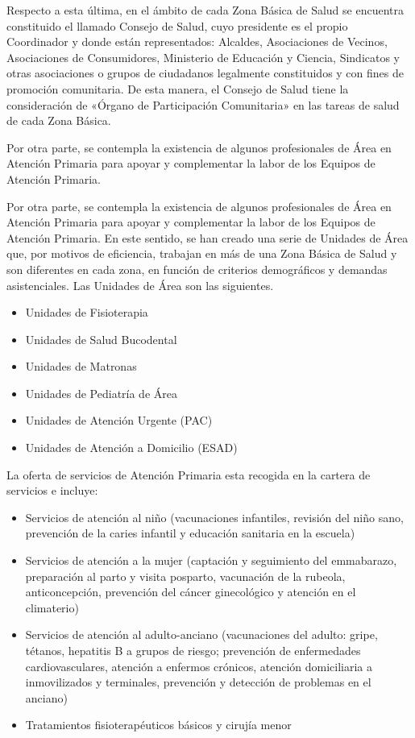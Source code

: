 Respecto a esta última, en el ámbito de cada Zona Básica de Salud se encuentra constituido el llamado Consejo de Salud, cuyo presidente es el propio Coordinador y donde están representados: Alcaldes, Asociaciones de Vecinos, Asociaciones de Consumidores, Ministerio de Educación y Ciencia, Sindicatos y otras asociaciones o grupos de ciudadanos legalmente constituidos y con fines de promoción comunitaria. De esta manera, el Consejo de Salud tiene la consideración de «Órgano de Participación Comunitaria» en las tareas de salud de cada Zona Básica.

Por otra parte, se contempla la existencia de algunos profesionales de Área en Atención Primaria para apoyar y complementar la labor de los Equipos de Atención Primaria.

Por otra parte, se contempla la existencia de algunos profesionales de Área en Atención Primaria para apoyar y complementar la labor de los Equipos de Atención Primaria. En este sentido, se han creado una serie de Unidades de Área que, por motivos de eficiencia, trabajan en más de una Zona Básica de Salud y son diferentes en cada zona, en función de criterios demográficos y demandas asistenciales. Las Unidades de Área son las siguientes.

\begin{itemize}
    \item Unidades de Fisioterapia
    \item Unidades de Salud Bucodental
    \item Unidades de Matronas
    \item Unidades de Pediatría de Área
    \item Unidades de Atención Urgente (PAC)
    \item Unidades de Atención a Domicilio (ESAD)
\end{itemize}

La oferta de servicios de Atención Primaria esta recogida en la cartera de servicios e incluye:

\begin{itemize}
    \item Servicios de atención al niño (vacunaciones infantiles, revisión del niño sano, prevención de la caries infantil y educación sanitaria en la escuela)
    \item Servicios de atención a la mujer (captación y seguimiento del emmabarazo, preparación al parto y visita posparto, vacunación de la rubeola, anticoncepción, prevención del cáncer ginecológico y atención en el climaterio)
    \item Servicios de atención al adulto-anciano (vacunaciones del adulto: gripe, tétanos, hepatitis B a grupos de riesgo; prevención de enfermedades cardiovasculares, atención a enfermos crónicos, atención domiciliaria a inmovilizados y terminales, prevención y detección de problemas en el anciano)
    \item Tratamientos fisioterapéuticos básicos y cirujía menor
\end{itemize}

